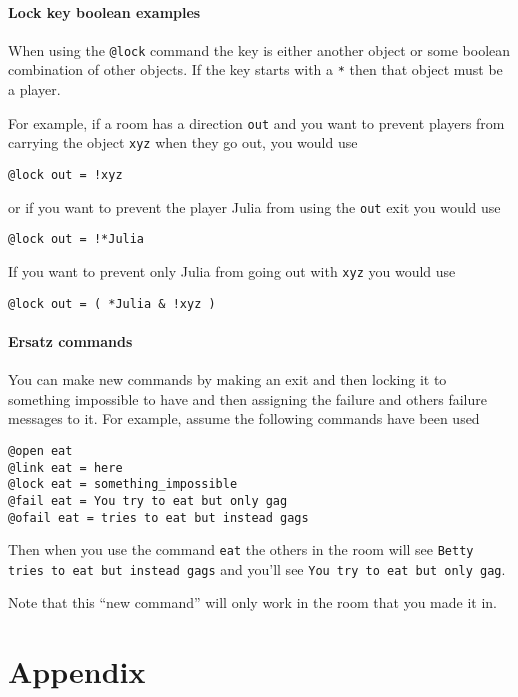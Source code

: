 \subsection{Lock key boolean examples}
\label{sec:lock-key-boolean-examples}

When using the {\tt @lock} command the key is either another object or
some boolean combination of other objects.  If the key starts with a
\verb|*| then that object must be a player.

For example, if a room has a direction {\tt out} and you want to
prevent players from carrying the object {\tt xyz} when they go out,
you would use
\begin{verbatim}
@lock out = !xyz
\end{verbatim}
or if you want to prevent the player Julia from using the {\tt out}
exit you would use
\begin{verbatim}
@lock out = !*Julia
\end{verbatim}
If you want to prevent only Julia from going out with {\tt xyz} you
would use
\begin{verbatim}
@lock out = ( *Julia & !xyz )
\end{verbatim}

\subsection{Ersatz commands}
\label{sec:ersatz-commands}

You can make new commands by making an exit and then locking it to
something impossible to have and then assigning the failure and others
failure messages to it.  For example, assume the following commands
have been used
\begin{verbatim}
@open eat
@link eat = here
@lock eat = something_impossible
@fail eat = You try to eat but only gag
@ofail eat = tries to eat but instead gags
\end{verbatim}
Then when you use the command {\tt eat} the others in the room will
see {\tt Betty tries to eat but instead gags} and you'll see {\tt You
try to eat but only gag\/}.

Note that this ``new command'' will only work in the room that you
made it in.

\clearpage

\part*{Appendix}

\appendix

